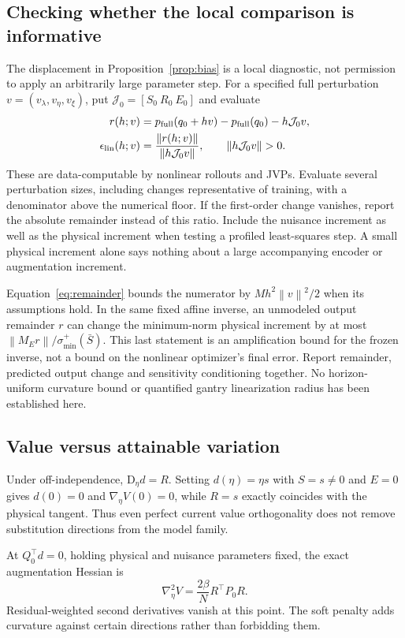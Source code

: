 \documentclass[11pt,a4paper]{article}
\newcommand{\D}{\mathrm D}
\newcommand{\norm}[1]{\left\lVert#1\right\rVert}
\newcommand{\full}{\mathrm{full}}
\theoremstyle{remark}
\begin{document}
\subsection{Checking whether the local comparison is informative}\label{sec:local-validity}
The displacement in Proposition~\ref{prop:bias} is a local diagnostic, not permission to apply an arbitrarily large parameter step. For a specified full perturbation $v=(v_\lambda,v_\eta,v_\xi)$, put $\mathcal J_0=[S_0\ R_0\ E_0]$ and evaluate
\begin{align}
 r(h;v)&=p_\full(q_0+hv)-p_\full(q_0)-h\mathcal J_0v,\label{eq:directional-remainder}\\
 \epsilon_{\rm lin}(h;v)&=
 \frac{\norm{r(h;v)}}{\norm{h\mathcal J_0v}},
 \qquad \norm{h\mathcal J_0v}>0.\label{eq:linearization-ratio}
\end{align}
These are data-computable by nonlinear rollouts and JVPs. Evaluate several perturbation sizes, including changes representative of training, with a denominator above the numerical floor. If the first-order change vanishes, report the absolute remainder instead of this ratio. Include the nuisance increment as well as the physical increment when testing a profiled least-squares step. A small physical increment alone says nothing about a large accompanying encoder or augmentation increment.

Equation~\eqref{eq:remainder} bounds the numerator by $Mh^2\norm v^2/2$ when its assumptions hold. In the same fixed affine inverse, an unmodeled output remainder $r$ can change the minimum-norm physical increment by at most $\norm{M_Er}/\sigma_{\min}^+(\bar S)$. This last statement is an amplification bound for the frozen inverse, not a bound on the nonlinear optimizer's final error. Report remainder, predicted output change and sensitivity conditioning together. No horizon-uniform curvature bound or quantified gantry linearization radius has been established here.

\subsection{Value versus attainable variation}
Under off-independence, $\D_\eta d=R$. Setting $d(\eta)=\eta s$ with $S=s\ne0$ and $E=0$ gives $d(0)=0$ and $\nabla_\eta V(0)=0$, while $R=s$ exactly coincides with the physical tangent. Thus even perfect current value orthogonality does not remove substitution directions from the model family.

At $Q_0^\top d=0$, holding physical and nuisance parameters fixed, the exact augmentation Hessian is
\begin{equation}\label{eq:hessian}
 \nabla_\eta^2V=\frac{2\beta}{N}R^\top P_0R.
\end{equation}
Residual-weighted second derivatives vanish at this point. The soft penalty adds curvature against certain directions rather than forbidding them.
\end{document}
